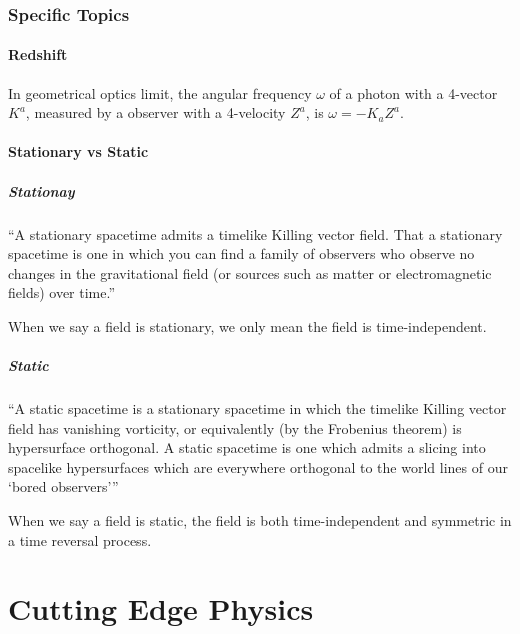 \documentclass[letterpaper,10pt,english]{sphinxmanual}
\begin{document}
\subsection{Specific Topics}
\label{relativity/GeneralRelativity:specific-topics}

\subsubsection{Redshift}
\label{relativity/GeneralRelativity:redshift}
In geometrical optics limit, the angular frequency \(\omega\) of a photon with a 4-vector \(K^a\), measured by a observer with a 4-velocity \(Z^a\), is \(\omega=-K_aZ^a\).


\subsubsection{Stationary vs Static}
\label{relativity/GeneralRelativity:stationary-vs-static}

\paragraph{Stationay}
\label{relativity/GeneralRelativity:stationay}
``A stationary spacetime admits a timelike Killing vector field. That a stationary spacetime is one in which you can find a family of observers who observe no changes in the gravitational field (or sources such as matter or electromagnetic fields) over time.''

When we say a field is stationary, we only mean the field is time-independent.


\paragraph{Static}
\label{relativity/GeneralRelativity:static}
``A static spacetime is a stationary spacetime in which the timelike Killing vector field has vanishing vorticity, or equivalently (by the Frobenius theorem) is hypersurface orthogonal. A static spacetime is one which admits a slicing into spacelike hypersurfaces which are everywhere orthogonal to the world lines of our `bored observers'''

When we say a field is static, the field is both time-independent and symmetric in a time reversal process.


\chapter{Cutting Edge Physics}
\label{index:cutting-edge-physics}
\end{document}
